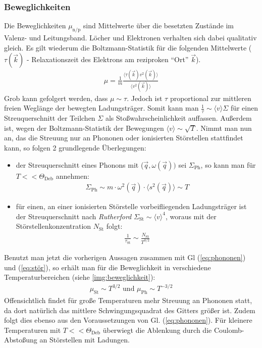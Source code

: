 \documentclass[numbers=noenddot,14pt,a4paper]{scrartcl}
\newcommand{\ix}[1]{_\text{#1}}
\newcommand{\tilt}[1]{\textit{#1}}
\begin{document}
\subsubsection{Beweglichkeiten}\label{ch:beweg}
Die Beweglichkeiten $\mu\ix{n/p}$ sind Mittelwerte über die besetzten Zustände im Valenz- und Leitungsband. Löcher und Elektronen verhalten sich dabei qualitativ gleich. Es gilt wiederum die Boltzmann-Statistik für die folgenden Mittelwerte ($\tau(\vec{k})$ - Relaxationszeit  des Elektrons am reziproken "`Ort"' $\vec{k}$).
\begin{align}
	\mu=\frac{1}{m}\frac{\langle\tau(\vec{k}) v^2(\vec{k})\rangle}{\langle v^2(\vec{k})\rangle}
\end{align}
Grob kann gefolgert werden, dass $\mu\sim\tau$. Jedoch ist $\tau$ proportional zur mittleren freien Weglänge der bewegten Ladungsträger. Somit kann man $\frac{1}{\tau}\sim\langle v\rangle\Sigma$ für einen Streuquerschnitt der Teilchen $\Sigma$ als Stoßwahrscheinlichkeit auffassen. Außerdem ist, wegen der Boltzmann-Statistik der Bewegungen \mbox{$\langle v\rangle\sim\sqrt{T}$.} Nimmt man nun an, das die Streuung nur an Phononen oder ionisierten Störstellen stattfindet kann, so folgen 2 grundlegende Überlegungen:
\begin{itemize}
	\item{der Streuquerschnitt eines Phonons mit ($\vec{q},\omega(\vec{q}))$ sei $\Sigma\ix{Ph}$, so kann man für $T<<\Theta\ix{Deb}$ annehmen:}
	\begin{align}
		\Sigma\ix{Ph}\sim m\cdot\omega^2(\vec{q})\cdot\langle s^2(\vec{q})\rangle\sim T \label{eq:phononen}
	\end{align}
	\item{für einen, an einer ionisierten Störstelle vorbeifliegenden Ladungsträger ist der Streuquerschnitt nach \tilt{Rutherford} $\Sigma\ix{St}\sim \langle v\rangle^4$, woraus mit der Störstellenkonzentration $N\ix{St}$ folgt:}
	\begin{align}
		\frac{1}{\tau\ix{St}}\sim \frac{N\ix{St}}{T^{3/2}} \label{eq:stör}
	\end{align}
\end{itemize}
Benutzt man jetzt die vorherigen Aussagen zusammen mit Gl (\ref{eq:phononen}) und (\ref{eq:stör}), so erhält man für die Beweglichkeit in verschiedene Temperaturbereichen (siehe \ref{img:beweglichkeit}):
\begin{align}
	\mu\ix{St}\sim T^{3/2} \,\, \text{und} \,\, \mu\ix{Ph}\sim T^{-3/2} \label{eq:beweg2}
\end{align}
Offensichtlich findet für große Temperaturen mehr Streuung an Phononen statt, da dort natürlich das mittlere Schwingungsquadrat des Gitters größer ist. Zudem folgt dies ebenso aus den Voraussetzungen von Gl. (\ref{eq:phononen}). Für kleinere Temperaturen mit $T<<\Theta\ix{Deb}$ überwiegt die Ablenkung durch die Coulomb-Abstoßung an Störstellen mit Ladungen.
\end{document}
